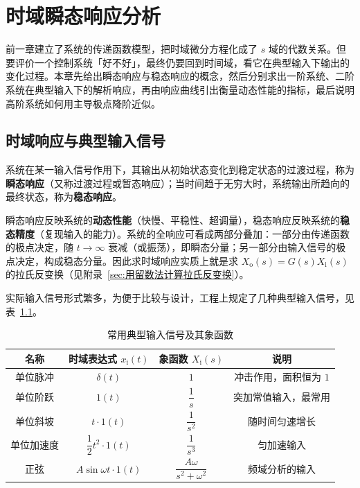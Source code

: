 \chapter{时域瞬态响应分析}
\label{sec:时域瞬态响应分析}

前一章建立了系统的传递函数模型，把时域微分方程化成了 $s$ 域的代数关系。但要评价一个控制系统「好不好」，最终仍要回到时间域，看它在典型输入下输出的变化过程。本章先给出瞬态响应与稳态响应的概念，然后分别求出一阶系统、二阶系统在典型输入下的解析响应，再由响应曲线引出衡量动态性能的指标，最后说明高阶系统如何用主导极点降阶近似。

\section{时域响应与典型输入信号}
\label{sec:时域响应与典型输入信号}

\begin{definition}[瞬态响应与稳态响应]
系统在某一输入信号作用下，其输出从初始状态变化到稳定状态的过渡过程，称为\textbf{瞬态响应}（又称过渡过程或暂态响应）；当时间趋于无穷大时，系统输出所趋向的最终状态，称为\textbf{稳态响应}。
\end{definition}

\begin{remark}
瞬态响应反映系统的\textbf{动态性能}（快慢、平稳性、超调量），稳态响应反映系统的\textbf{稳态精度}（复现输入的能力）。系统的全响应可看成两部分叠加：一部分由传递函数的极点决定，随 $t\to\infty$ 衰减（或振荡），即瞬态分量；另一部分由输入信号的极点决定，构成稳态分量。因此求时域响应实质上就是求 $X_{\mathrm{o}}(s)=G(s)X_{\mathrm{i}}(s)$ 的拉氏反变换（见附录~\ref{sec:用留数法计算拉氏反变换}）。
\end{remark}

实际输入信号形式繁多，为便于比较与设计，工程上规定了几种典型输入信号，见表~\ref{tab:典型输入信号}。

\begin{table}[H]
\centering
\caption{常用典型输入信号及其象函数}
\label{tab:典型输入信号}
\renewcommand{\arraystretch}{1.5}
\begin{tabular}{cccc}
\toprule
名称 & 时域表达式 $x_{\mathrm{i}}(t)$ & 象函数 $X_{\mathrm{i}}(s)$ & 说明 \\
\midrule
单位脉冲 & $\delta(t)$ & $1$ & 冲击作用，面积恒为 $1$ \\
单位阶跃 & $1(t)$ & $\dfrac{1}{s}$ & 突加常值输入，最常用 \\
单位斜坡 & $t\cdot 1(t)$ & $\dfrac{1}{s^{2}}$ & 随时间匀速增长 \\
单位加速度 & $\dfrac{1}{2}t^{2}\cdot 1(t)$ & $\dfrac{1}{s^{3}}$ & 匀加速输入 \\
正弦 & $A\sin\omega t\cdot 1(t)$ & $\dfrac{A\omega}{s^{2}+\omega^{2}}$ & 频域分析的输入 \\
\bottomrule
\end{tabular}
\end{table}

